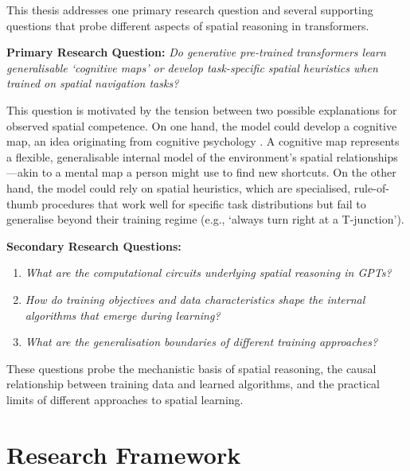 This thesis addresses one primary research question and several supporting questions that probe different aspects of spatial reasoning in transformers.

\textbf{Primary Research Question:} \textit{Do generative pre-trained transformers learn generalisable `cognitive maps' or develop task-specific spatial heuristics when trained on spatial navigation tasks?}

This question is motivated by the tension between two possible explanations for observed spatial competence. On one hand, the model could develop a cognitive map, an idea originating from cognitive psychology \citep{tolman1948cognitive}. A cognitive map represents a flexible, generalisable internal model of the environment's spatial relationships—akin to a mental map a person might use to find new shortcuts. On the other hand, the model could rely on spatial heuristics, which are specialised, rule-of-thumb procedures that work well for specific task distributions but fail to generalise beyond their training regime (e.g., `always turn right at a T-junction'). 

\textbf{Secondary Research Questions:}
\begin{enumerate}
    \item \textit{What are the computational circuits underlying spatial reasoning in GPTs?}
    \item \textit{How do training objectives and data characteristics shape the internal algorithms that emerge during learning?}
    \item \textit{What are the generalisation boundaries of different training approaches?}
\end{enumerate}

These questions probe the mechanistic basis of spatial reasoning, the causal relationship between training data and learned algorithms, and the practical limits of different approaches to spatial learning.

\section{Research Framework}

